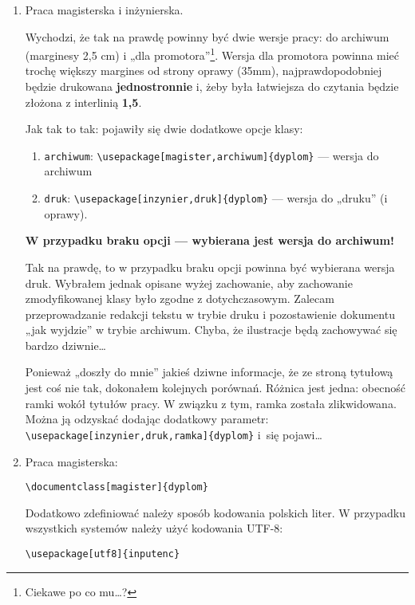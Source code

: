 \begin{enumerate}
\item
Praca magisterska i inżynierska.

Wychodzi, że tak na prawdę powinny być dwie wersje pracy: do archiwum (marginesy 2,5 cm) i „dla promotora”\footnote{Ciekawe po co mu…?}. Wersja dla promotora powinna mieć trochę większy margines od strony oprawy (35mm), najprawdopodobniej będzie drukowana \textbf{jednostronnie} i, żeby była łatwiejsza do czytania będzie złożona z interlinią \textbf{1,5}.

Jak tak to tak:  pojawiły się dwie dodatkowe opcje klasy:
\begin{enumerate}
\item
\texttt{archiwum}: \verb|\usepackage[magister,archiwum]{dyplom}| — wersja do archiwum
\item
\texttt{druk}: \verb|\usepackage[inzynier,druk]{dyplom}| — wersja do „druku” (i oprawy).
\end{enumerate}
\textbf{W przypadku braku opcji — wybierana jest wersja do archiwum!}

Tak na prawdę, to w przypadku braku opcji powinna być wybierana wersja druk. Wybrałem jednak opisane wyżej zachowanie, aby zachowanie zmodyfikowanej klasy było zgodne z dotychczasowym. Zalecam przeprowadzanie redakcji tekstu w trybie druku i pozostawienie dokumentu „jak wyjdzie” w trybie archiwum. Chyba, że ilustracje będą zachowywać się bardzo dziwnie…

Ponieważ „doszły do mnie” jakieś dziwne informacje, że ze stroną tytułową jest coś nie tak, dokonałem kolejnych porównań. Różnica jest jedna: obecność ramki wokół tytułów pracy. W związku z tym, ramka została zlikwidowana. Można ją odzyskać dodając dodatkowy parametr: \verb|\usepackage[inzynier,druk,ramka]{dyplom}| i~się pojawi…
\item
Praca magisterska:
\begin{verbatim}
\documentclass[magister]{dyplom}
\end{verbatim}
Dodatkowo zdefiniować należy sposób kodowania polskich liter. W przypadku wszystkich systemów należy użyć kodowania UTF-8:
\begin{verbatim}
\usepackage[utf8]{inputenc}
\end{verbatim}


\end{enumerate}
